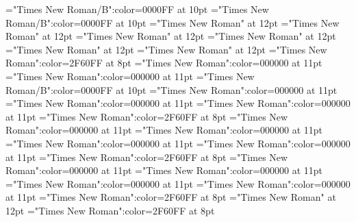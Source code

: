 \documentclass[a4paper]{article}
\begin{document}
 
\pagestyle{plain} 
\font\headwordafterentrycletDatadicBody="Times New Roman/B":color=0000FF at 10pt
\font\headwordentrycletDatadicBody="Times New Roman/B":color=0000FF at 10pt
\font\CmPicturepublishStemCaptionCaptionPubptpictureCaptionpictureRightNoneentrycletDatadicBody="Times New Roman" at 12pt
\font\CmPicturepublishStemCaptionSenseNumberpictureCaptionpictureRightNoneentrycletDatadicBody="Times New Roman" at 12pt
\font\pictureCaptionpictureRightNoneentrycletDatadicBody="Times New Roman" at 12pt
\font\picturepictureRightNoneentrycletDatadicBody="Times New Roman" at 12pt
\font\pictureRightNoneentrycletDatadicBody="Times New Roman" at 12pt
\font\entrycletDatadicBody="Times New Roman" at 12pt
\font\xlanguagetagdefinitionLcensensesensesentryletDatadicBody="Times New Roman":color=2F60FF at 8pt
\font{}="Times New Roman":color=000000 at 11pt
\font\xsensenumberLcensensesensesentryletDatadicBody="Times New Roman":color=000000 at 11pt
\font\xhomographnumberptheadwordentryletDatadicBody="Times New Roman/B":color=0000FF at 10pt
\font\sensecrossrefsehlexreftargetsxitemrelationssensesensesentryletDatadicBody="Times New Roman":color=000000 at 11pt
\font\lexreftargetsxitemrelationssensesensesentryletDatadicBody="Times New Roman":color=000000 at 11pt
\font\xitemrelationssensesensesentryletDatadicBody="Times New Roman":color=000000 at 11pt
\font\xlanguagetagtranslationpttranslationsexamplessensesensesentryletDatadicBody="Times New Roman":color=2F60FF at 8pt
\font\translationpttranslationsexamplessensesensesentryletDatadicBody="Times New Roman":color=000000 at 11pt
\font\translationsexamplessensesensesentryletDatadicBody="Times New Roman":color=000000 at 11pt
\font\examplesehexamplessensesensesentryletDatadicBody="Times New Roman":color=000000 at 11pt
\font\examplessensesensesentryletDatadicBody="Times New Roman":color=000000 at 11pt
\font\xlanguagetagdefinitionptsensesensesentryletDatadicBody="Times New Roman":color=2F60FF at 8pt
\font{}="Times New Roman":color=000000 at 11pt
\font\sensecrossrefsehlexreftargetsrelationssensesensesentryletDatadicBody="Times New Roman":color=000000 at 11pt
\font\lexreftargetsrelationssensesensesentryletDatadicBody="Times New Roman":color=000000 at 11pt
\font\relationssensesensesentryletDatadicBody="Times New Roman":color=000000 at 11pt
\font\xlanguagetagxitemendefinitionLcptsensesensesentrybletDatadicBody="Times New Roman":color=2F60FF at 8pt
\font\xitemendefinitionLcptsensesensesentrybletDatadicBody="Times New Roman" at 12pt
\font\xlanguagetagxitemptdefinitionLcptsensesensesentrybletDatadicBody="Times New Roman":color=2F60FF at 8pt
\end{document}
